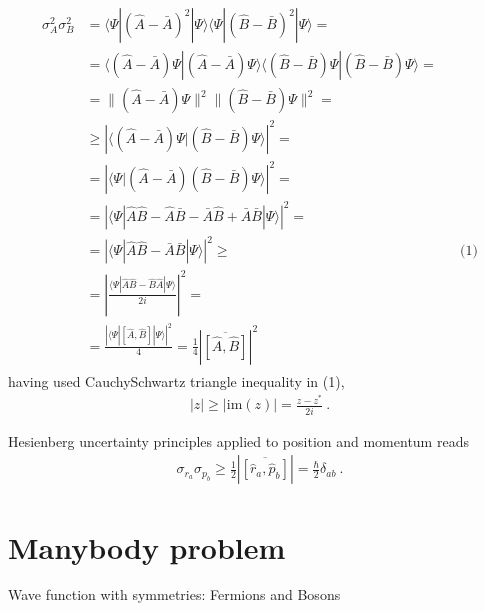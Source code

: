 \documentclass[letterpaper,10pt,english]{jupyterBook}
\begin{document}
\begin{equation*}
\begin{split}\begin{aligned}
 \sigma^2_A \sigma^2_B
 & = \langle \Psi | \left(\hat{A} - \bar{A} \right)^2 | \Psi \rangle\langle \Psi | \left(\hat{B} - \bar{B} \right)^2 | \Psi \rangle = \\
 & = \langle (\hat{A} - \bar{A} ) \Psi |  (\hat{A} - \bar{A} ) \Psi \rangle \langle  (\hat{B} - \bar{B} ) \Psi |  (\hat{B} - \bar{B} ) \Psi \rangle = \\
 & = \| ( \hat{A} - \bar{A} ) \Psi \|^2 \| ( \hat{B} - \bar{B} ) \Psi \|^2 = \\
 & \ge \left| \langle ( \hat{A} - \bar{A} ) \Psi | ( \hat{B} - \bar{B} ) \Psi  \rangle \right|^2 = \\
 & = \left| \langle \Psi | (\hat{A} - \bar{A})(\hat{B} - \bar{B}) \Psi \rangle \right|^2 = \\
 & = \left| \langle \Psi | \hat{A}\hat{B} - \hat{A}\bar{B} - \bar{A}\hat{B} + \bar{A}\bar{B} | \Psi \rangle \right|^2 = \\
 & = \left| \langle \Psi | \hat{A}\hat{B} - \bar{A}\bar{B} | \Psi \rangle \right|^2 \ge && \text{(1)} \\
 & = \left| \frac{\langle \Psi | \hat{A}\hat{B} - \hat{B}\hat{A} | \Psi \rangle}{2i} \right|^2 = \\
 & = \frac{ \left|\langle \Psi | [\hat{A}, \hat{B}] | \Psi \rangle \right|^2}{4} = \frac{1}{4} \left| \overline{[\hat{A}, \hat{B}]} \right|^2
\end{aligned}\end{split}
\end{equation*}
\sphinxAtStartPar
having used Cauchy\sphinxhyphen{}Schwartz triangle inequality in (1),
\begin{equation*}
\begin{split}|z| \ge | \text{im}(z) | = \frac{z - z^*}{2 i} \ .\end{split}
\end{equation*}


\sphinxAtStartPar
Hesienberg uncertainty principles applied to position and momentum reads
\begin{equation*}
\begin{split}\sigma_{r_a} \sigma_{p_b} \ge \frac{1}{2} \left|\overline{[\hat{r}_a, \hat{p}_b]}\right| = \frac{\hbar}{2}  \delta_{ab} \ .\end{split}
\end{equation*}

\section{Many\sphinxhyphen{}body problem}
\label{\detokenize{ch/quantum-mechanics/intro:many-body-problem}}
\sphinxAtStartPar
Wave function with symmetries: Fermions and Bosons
\end{document}
